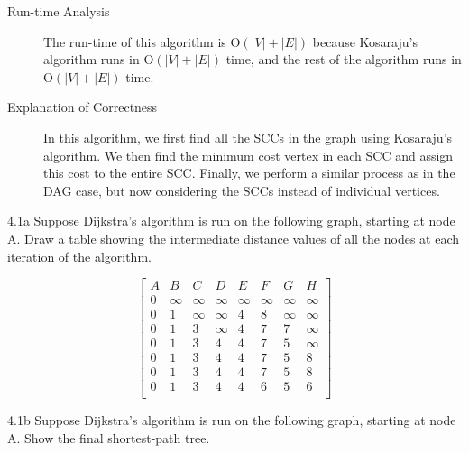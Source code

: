 \documentclass[boxes]{rutgers_hw}
\begin{document}
    \pagebreak

    \begin{description}
        \item[Run-time Analysis] The run-time of this algorithm is O$(|V| + |E|)$ because Kosaraju's algorithm runs in O$(|V| + |E|)$ time, and the rest of the algorithm runs in O$(|V| + |E|)$ time.
        \item[Explanation of Correctness] In this algorithm, we first find all the SCCs in the graph using Kosaraju's algorithm. We then find the minimum cost vertex in each SCC and assign this cost to the entire SCC. Finally, we perform a similar process as in the DAG case, but now considering the SCCs instead of individual vertices.
    \end{description}

    \begin{exern}{4.1a}
        Suppose Dijkstra’s algorithm is run on the following graph, starting at node A.
        Draw a table showing the intermediate distance values of all the nodes at each iteration of the algorithm.
    \end{exern}

    \[\begin{bmatrix}
        A & B & C & D & E & F & G & H \\
        0 & \infty& \infty& \infty& \infty& \infty& \infty& \infty\\
        0 & 1 & \infty& \infty& 4 & 8 & \infty& \infty\\
        0 & 1 & 3 & \infty& 4 & 7 & 7 & \infty\\
        0 & 1 & 3 & 4 & 4 & 7 & 5 & \infty\\
        0 & 1 & 3 & 4 & 4 & 7 & 5 & 8 \\
        0 & 1 & 3 & 4 & 4 & 7 & 5 & 8 \\
        0 & 1 & 3 & 4 & 4 & 6 & 5 & 6 \\
    \end{bmatrix}\]
    
    \begin{exern}{4.1b}
        Suppose Dijkstra’s algorithm is run on the following graph, starting at node A.
        Show the final shortest-path tree.
    \end{exern}
\end{document}

